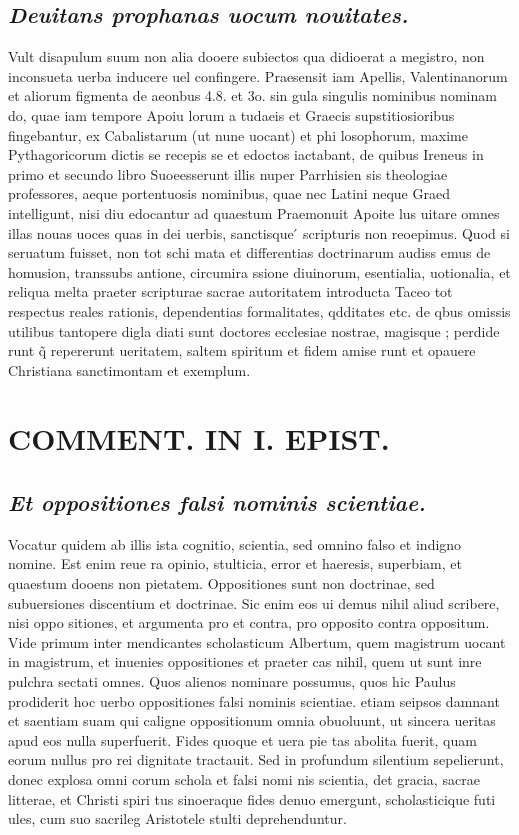 \documentclass{article}
\begin{document}
\begin{pages}
\subsection*{\textit{Deuitans prophanas uocum nouitates. }}\pstart Vult disapulum suum non alia dooere subiectos qua didioerat a megistro, non inconsueta uerba inducere uel confingere. Praesensit iam Apellis, Valentinanorum et aliorum figmenta de aeonbus 4.8. et 3o. sin gula singulis nominibus nominam do, quae iam tempore Apoiu lorum a tudaeis et Graecis supstitiosioribus fingebantur, ex Cabalistarum (ut nune uocant) et phi losophorum, maxime Pythagoricorum dictis se recepis se et edoctos iactabant, de quibus Ireneus in primo et secundo libro Suoeesserunt illis nuper Parrhisien sis theologiae professores, aeque portentuosis nominibus, quae nec Latini neque Graed intelligunt, nisi diu edocantur ad quaestum Praemonuit Apoite lus uitare omnes illas nouas uoces quas in dei uerbis, sanctisque ́ scripturis non reoepimus. Quod si seruatum fuisset, non tot schi mata et differentias doctrinarum audiss emus de homusion, transsubs antione, circumira ssione diuinorum, esentialia, uotionalia, et reliqua melta praeter scripturae sacrae autoritatem introducta Taceo tot respectus reales rationis, dependentias formalitates, qdditates etc. de qbus omissis utilibus tantopere digla diati sunt doctores ecclesiae nostrae, magisque ; perdide runt q̃ repererunt ueritatem, saltem spiritum et fidem amise runt et opauere Christiana sanctimontam et exemplum.  \pend
\section*{COMMENT. IN I. EPIST. }
\marginpar{[ p.188 ]}
{}
\subsection*{\textit{Et oppositiones falsi nominis scientiae. }}\pstart Vocatur quidem ab illis ista cognitio, scientia, sed omnino falso et indigno nomine. Est enim reue ra opinio, stulticia, error et haeresis, superbiam, et quaestum dooens non pietatem. Oppositiones sunt non doctrinae, sed subuersiones discentium et doctrinae. Sic enim eos ui demus nihil aliud scribere, nisi oppo sitiones, et argumenta pro et contra, pro opposito contra oppositum. Vide primum inter mendicantes scholasticum Albertum, quem magistrum uocant in magistrum, et inuenies oppositiones et praeter cas nihil, quem ut sunt inre pulchra sectati omnes. Quos alienos nominare possumus, quos hic Paulus prodiderit hoc uerbo oppositiones falsi nominis scientiae. etiam seipsos damnant et saentiam suam qui caligne oppositionum omnia obuoluunt, ut sincera ueritas apud eos nulla superfuerit. Fides quoque et uera pie tas abolita fuerit, quam eorum nullus pro rei dignitate tractauit. Sed in profundum silentium sepelierunt, donec explosa omni corum schola et falsi nomi nis scientia, det gracia, sacrae litterae, et Christi spiri tus sinoeraque fides denuo emergunt, scholasticique futi ules, cum suo sacrileg Aristotele stulti deprehenduntur.  \pend

\end{pages}
\end{document}
